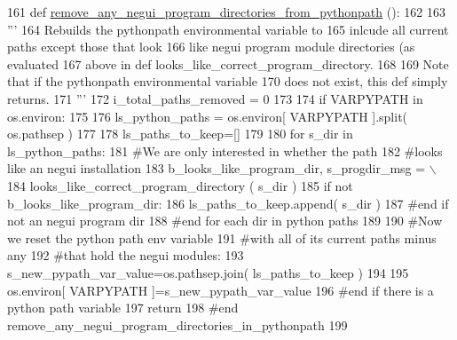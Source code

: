 \begin{DoxyCode}
161 \textcolor{keyword}{def }\hyperlink{namespacenegui_1_1setup__negui__environment_aaedbf956380dc5707c61769abf071c40}{remove\_any\_negui\_program\_directories\_from\_pythonpath}
      ():
162 
163     \textcolor{stringliteral}{'''}
164 \textcolor{stringliteral}{    Rebuilds the pythonpath environmental variable to }
165 \textcolor{stringliteral}{    inlcude all current paths except those that look}
166 \textcolor{stringliteral}{    like negui program module directories (as evaluated}
167 \textcolor{stringliteral}{    above in def looks\_like\_correct\_program\_directory.}
168 \textcolor{stringliteral}{}
169 \textcolor{stringliteral}{    Note that if the pythonpath environmental variable}
170 \textcolor{stringliteral}{    does not exist, this def simply returns.}
171 \textcolor{stringliteral}{    '''}
172     i\_total\_paths\_removed = 0
173 
174     \textcolor{keywordflow}{if} VARPYPATH \textcolor{keywordflow}{in} os.environ:
175 
176         ls\_python\_paths = os.environ[ VARPYPATH ].split( os.pathsep ) 
177 
178         ls\_paths\_to\_keep=[]
179 
180         \textcolor{keywordflow}{for} s\_dir \textcolor{keywordflow}{in} ls\_python\_paths:
181             \textcolor{comment}{#We are only interested in whether the path}
182             \textcolor{comment}{#looks like an negui installation}
183             b\_looks\_like\_program\_dir, s\_progdir\_msg = \(\backslash\)
184                         looks\_like\_correct\_program\_directory ( s\_dir )
185             \textcolor{keywordflow}{if} \textcolor{keywordflow}{not} b\_looks\_like\_program\_dir:
186                 ls\_paths\_to\_keep.append( s\_dir )
187             \textcolor{comment}{#end if not an negui program dir}
188         \textcolor{comment}{#end for each dir in python paths}
189 
190         \textcolor{comment}{#Now we reset the python path env variable}
191         \textcolor{comment}{#with all of its current paths minus any}
192         \textcolor{comment}{#that hold the negui modules:}
193         s\_new\_pypath\_var\_value=os.pathsep.join( ls\_paths\_to\_keep )
194 
195         os.environ[ VARPYPATH ]=s\_new\_pypath\_var\_value
196     \textcolor{comment}{#end if there is a python path variable}
197     \textcolor{keywordflow}{return}
198 \textcolor{comment}{#end remove\_any\_negui\_program\_directories\_in\_pythonpath}
199 
\end{DoxyCode}
